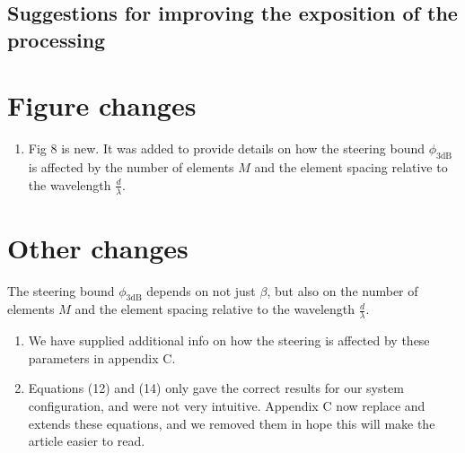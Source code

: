 \documentclass[11pt]{article} %
\newcommand\1{\vec 1}
\begin{document}
\subsection*{Suggestions for improving the exposition of the processing}



\newpage

\section{Figure changes}

\begin{enumerate}
\item Fig 8 is new. It was added to provide details on how the steering bound $\phi_\mathrm{3dB}$ is affected by the number of elements $M$ and the element spacing relative to the wavelength $\frac{d}{\lambda}$.
\end{enumerate}


\section{Other changes}

The steering bound $\phi_\mathrm{3dB}$ depends on not just $\beta$, but also on the number of elements $M$ and the element spacing relative to the wavelength $\frac{d}{\lambda}$.
\begin{enumerate}
\item We have supplied additional info on how the steering is affected by these parameters in appendix C.
\item Equations (12) and (14) only gave the correct results for our system configuration, and were not very intuitive. Appendix C now replace and extends these equations, and we removed them in hope this will make the article easier to read.
\end{enumerate}
\end{document}

